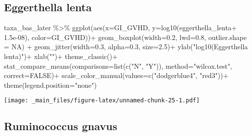 \documentclass[
]{book}
\newenvironment{Shaded}{\begin{snugshade}}{\end{snugshade}}
\newcommand{\AttributeTok}[1]{\textcolor[rgb]{0.77,0.63,0.00}{#1}}
\newcommand{\ConstantTok}[1]{\textcolor[rgb]{0.00,0.00,0.00}{#1}}
\newcommand{\FloatTok}[1]{\textcolor[rgb]{0.00,0.00,0.81}{#1}}
\newcommand{\FunctionTok}[1]{\textcolor[rgb]{0.00,0.00,0.00}{#1}}
\newcommand{\NormalTok}[1]{#1}
\newcommand{\SpecialCharTok}[1]{\textcolor[rgb]{0.00,0.00,0.00}{#1}}
\newcommand{\StringTok}[1]{\textcolor[rgb]{0.31,0.60,0.02}{#1}}
\begin{document}
\hypertarget{eggerthella-lenta}{%
\subsection{Eggerthella lenta}\label{eggerthella-lenta}}

\begin{Shaded}
\begin{Highlighting}[]
\NormalTok{taxa\_bas\_later }\SpecialCharTok{\%\textgreater{}\%} 
  \FunctionTok{ggplot}\NormalTok{(}\FunctionTok{aes}\NormalTok{(}\AttributeTok{x=}\NormalTok{GI\_GVHD, }\AttributeTok{y=}\FunctionTok{log10}\NormalTok{(eggerthella\_lenta}\SpecialCharTok{+} \FloatTok{1.5e{-}08}\NormalTok{), }\AttributeTok{color=}\NormalTok{GI\_GVHD))}\SpecialCharTok{+}
  \FunctionTok{geom\_boxplot}\NormalTok{(}\AttributeTok{width=}\FloatTok{0.2}\NormalTok{, }\AttributeTok{lwd=}\FloatTok{0.8}\NormalTok{, }\AttributeTok{outlier.shape =} \ConstantTok{NA}\NormalTok{) }\SpecialCharTok{+}
  \FunctionTok{geom\_jitter}\NormalTok{(}\AttributeTok{width=}\FloatTok{0.3}\NormalTok{, }\AttributeTok{alpha=}\FloatTok{0.3}\NormalTok{, }\AttributeTok{size=}\FloatTok{2.5}\NormalTok{)}\SpecialCharTok{+}
  \FunctionTok{ylab}\NormalTok{(}\StringTok{"log10(Eggerthella lenta)"}\NormalTok{)}\SpecialCharTok{+}
  \FunctionTok{xlab}\NormalTok{(}\StringTok{""}\NormalTok{)}\SpecialCharTok{+}
  \FunctionTok{theme\_classic}\NormalTok{()}\SpecialCharTok{+}
  \FunctionTok{stat\_compare\_means}\NormalTok{(}\AttributeTok{comparisons=}\FunctionTok{list}\NormalTok{(}\FunctionTok{c}\NormalTok{(}\StringTok{"N"}\NormalTok{, }\StringTok{"Y"}\NormalTok{)),}
                     \AttributeTok{method=}\StringTok{"wilcox.test"}\NormalTok{,}
                     \AttributeTok{correct=}\ConstantTok{FALSE}\NormalTok{)}\SpecialCharTok{+}
  \FunctionTok{scale\_color\_manual}\NormalTok{(}\AttributeTok{values=}\FunctionTok{c}\NormalTok{(}\StringTok{"dodgerblue4"}\NormalTok{, }\StringTok{"red3"}\NormalTok{))}\SpecialCharTok{+}
  \FunctionTok{theme}\NormalTok{(}\AttributeTok{legend.position=}\StringTok{"none"}\NormalTok{)}
\end{Highlighting}
\end{Shaded}

\texttt{[image: \_main\_files/figure-latex/unnamed-chunk-25-1.pdf]}

\hypertarget{ruminococcus-gnavus}{%
\subsection{Ruminococcus gnavus}\label{ruminococcus-gnavus}}
\end{document}
